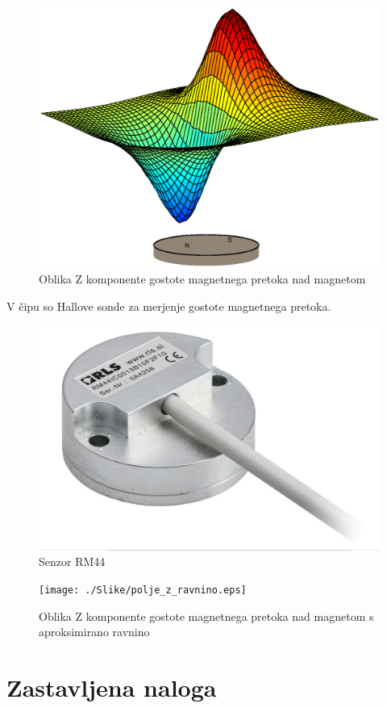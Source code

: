 \begin{figure}[h]
	\centering
	\includegraphics[width=0.8\columnwidth]{./Slike/polje_brez_ravnine.eps}
	\caption{Oblika Z komponente gostote magnetnega pretoka nad magnetom}
	\label{polje_brez_ravnine}
\end{figure}

V čipu so Hallove sonde za merjenje gostote magnetnega pretoka.

\begin{figure}[h]
	\centering
	\includegraphics[width=0.8\columnwidth]{./Slike/senzorRM44.jpg}
	\caption{Senzor RM44}
	\label{RM44}
\end{figure}
\begin{figure}[h]
	\centering
	\texttt{[image: ./Slike/polje\_z\_ravnino.eps]}
	\caption{Oblika Z komponente gostote magnetnega pretoka nad magnetom s aproksimirano ravnino}
	\label{polje_brez_ravnine}
\end{figure}




\chapter{Zastavljena naloga}

